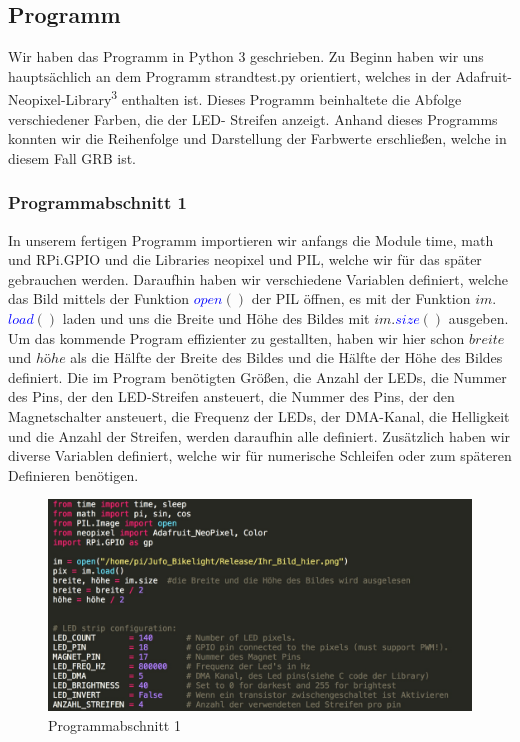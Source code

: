 \documentclass [a4paper, 11pt] {article}
\begin{document}
\subsection{Programm}
Wir haben das Programm in Python 3 geschrieben. Zu Beginn haben wir uns hauptsächlich an dem Programm strandtest.py orientiert, welches in der Adafruit-Neopixel-Library\textsuperscript{3} enthalten ist. Dieses Programm beinhaltete die Abfolge verschiedener Farben, die der LED- Streifen anzeigt. Anhand dieses Programms konnten wir die Reihenfolge und Darstellung der Farbwerte erschließen, welche in diesem Fall GRB ist.
\subsubsection{Programmabschnitt 1}
In unserem fertigen Programm importieren wir anfangs die Module time, math und RPi.GPIO und die Libraries neopixel und PIL, welche wir für das später gebrauchen werden. Daraufhin haben wir verschiedene Variablen definiert, welche das Bild mittels der Funktion \textcolor{blue}{$open$}{$()$} der PIL öffnen, es mit der Funktion {$im.$}\textcolor{blue}{$load$}{$()$} laden und uns die Breite und Höhe des Bildes mit {$im.$}\textcolor{blue}{$size$}{$()$} ausgeben. Um das kommende Program effizienter zu gestallten, haben wir hier schon {$breite$} und {$h\text{ö}he$} als die Hälfte der Breite des Bildes und die Hälfte der Höhe des Bildes definiert. Die im Program benötigten Größen, die Anzahl der LEDs, die Nummer des Pins, der den LED-Streifen ansteuert, die Nummer des Pins, der den Magnetschalter ansteuert, die Frequenz der LEDs, der DMA-Kanal, die Helligkeit und die Anzahl der Streifen, werden daraufhin alle definiert. Zusätzlich haben wir diverse Variablen definiert, welche wir für numerische Schleifen oder zum späteren Definieren benötigen.
\begin{figure}[h]
	\centering
	\includegraphics[width=16cm]{P1.png}
	\caption{Programmabschnitt 1}
\end{figure}
\end{document}
